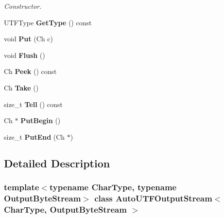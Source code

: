 \begin{DoxyCompactItemize}
\begin{DoxyCompactList}\small\item\em Constructor. \end{DoxyCompactList}\item 
\mbox{\label{classAutoUTFOutputStream_a62091565a8103d69002be2e2f4f0ba2c}} 
U\+T\+F\+Type {\bfseries Get\+Type} () const
\item 
\mbox{\label{classAutoUTFOutputStream_ad12b33e48c45bdbf2628fd3d5461041a}} 
void {\bfseries Put} (Ch c)
\item 
\mbox{\label{classAutoUTFOutputStream_a38b54c84ba0c479552256ac092529f47}} 
void {\bfseries Flush} ()
\item 
\mbox{\label{classAutoUTFOutputStream_ad706f62fd5d22967e5949f3a05087e4e}} 
Ch {\bfseries Peek} () const
\item 
\mbox{\label{classAutoUTFOutputStream_a44ee7d84ba13fece17574d01b7be574b}} 
Ch {\bfseries Take} ()
\item 
\mbox{\label{classAutoUTFOutputStream_a81acbe33d84a28b7d5040d576ae22b5a}} 
size\+\_\+t {\bfseries Tell} () const
\item 
\mbox{\label{classAutoUTFOutputStream_a3c7333661dba3d2210f0b287bdd6c1f3}} 
Ch $\ast$ {\bfseries Put\+Begin} ()
\item 
\mbox{\label{classAutoUTFOutputStream_a4b16bda191526c894501fce447e95b8d}} 
size\+\_\+t {\bfseries Put\+End} (Ch $\ast$)
\end{DoxyCompactItemize}


\subsection{Detailed Description}
\subsubsection*{template$<$typename Char\+Type, typename Output\+Byte\+Stream$>$\newline
class Auto\+U\+T\+F\+Output\+Stream$<$ Char\+Type, Output\+Byte\+Stream $>$}

